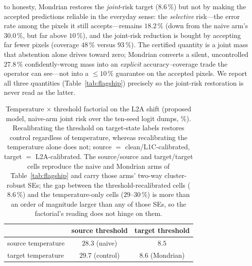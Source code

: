 \documentclass[preprint,3p,times]{elsarticle}
\begin{document}
to honesty, Mondrian restores the \emph{joint}-risk target ($8.6\,\%$) but not by making the accepted predictions reliable in the everyday sense: the \emph{selective} risk---the error rate among the pixels it still accepts---remains $18.2\,\%$ (down from the naive arm's $30.0\,\%$, but far above $10\,\%$), and the joint-risk reduction is bought by accepting far fewer pixels (coverage $48\,\%$ versus $93\,\%$). The certified quantity is a joint mass that abstention alone drives toward zero; Mondrian converts a silent, uncontrolled $27.8\,\%$ confidently-wrong mass into an \emph{explicit} accuracy--coverage trade the operator can see---not into a $\leq\!10\,\%$ guarantee on the accepted pixels. We report all three quantities (Table~\ref{tab:flagship}) precisely so the joint-risk restoration is never read as the latter.

\begin{table}[t]
\centering
\caption{Temperature $\times$ threshold factorial on the L2A shift (proposed model, naive-arm joint risk over the ten-seed logit dumps, \%). Recalibrating the threshold on target-state labels restores control regardless of temperature, whereas recalibrating the temperature alone does not; source $=$ clean/L1C-calibrated, target $=$ L2A-calibrated. The source/source and target/target cells reproduce the naive and Mondrian arms of Table~\ref{tab:flagship} and carry those arms' two-way cluster-robust SEs; the gap between the threshold-recalibrated cells ($8.6\,\%$) and the temperature-only cells ($29$--$30\,\%$) is more than an order of magnitude larger than any of those SEs, so the factorial's reading does not hinge on them.}
\label{tab:factorial}
\begin{tabular}{lcc}
\toprule
 & source threshold & target threshold \\
\midrule
source temperature & $28.3$ (naive) & $8.5$ \\
target temperature & $29.7$ (control) & $8.6$ (Mondrian) \\
\bottomrule
\end{tabular}
\end{table}
\end{document}
